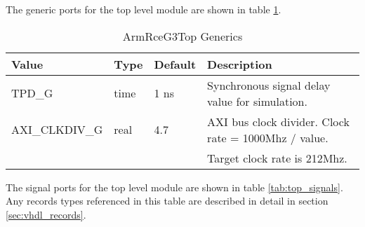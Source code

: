 \documentclass[11pt]{article}
\begin{document}
The generic ports for the top level module are shown in table \ref{tab:top_generics}.

\begin{table}[H]
\small
\centering
   \begin{tabular}{| l | l | l | l | }
      \hline \textbf{Value} & \textbf{Type} & \textbf{Default} & \textbf{Description} \\
      \hline TPD\_G          & time    & 1 ns  & Synchronous signal delay value for simulation.       \\
      \hline AXI\_CLKDIV\_G  & real    & 4.7   & AXI bus clock divider. Clock rate = 1000Mhz / value. \\
                             &         &       & Target clock rate is 212Mhz.                         \\
      \hline
   \end{tabular}
   \caption{ArmRceG3Top Generics}
   \label{tab:top_generics}
\end{table}

The signal ports for the top level module are shown in table \ref{tab:top_signals}.
Any records types referenced in this table are described in detail in section \ref{sec:vhdl_records}. 
\end{document}
